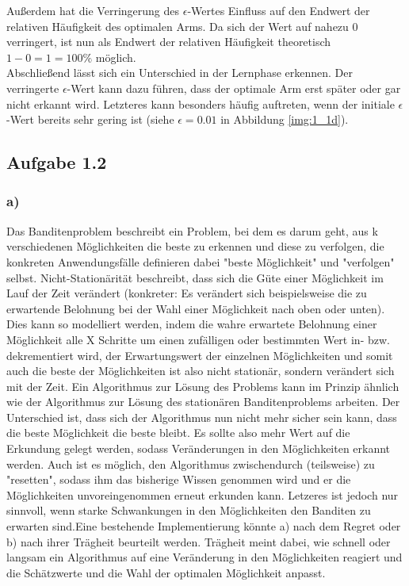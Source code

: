 \documentclass[11pt]{article}
\begin{document}
Außerdem hat die Verringerung des $\epsilon$-Wertes Einfluss auf den Endwert der relativen Häufigkeit des optimalen Arms. Da sich der Wert auf nahezu $0$ verringert, ist nun als Endwert der relativen Häufigkeit theoretisch $1-0=1=100\%$ möglich.\\
Abschließend lässt sich ein Unterschied in der Lernphase erkennen. Der verringerte $\epsilon$-Wert kann dazu führen, dass der optimale Arm erst später oder gar nicht erkannt wird. Letzteres kann besonders häufig auftreten, wenn der initiale $\epsilon$-Wert bereits sehr gering ist (siehe $\epsilon=0.01$ in Abbildung \ref{img:1_1d}).

\subsection*{Aufgabe 1.2}
\subsubsection*{a)}
Das Banditenproblem beschreibt ein Problem, bei dem es darum geht, aus k verschiedenen Möglichkeiten die beste zu erkennen und diese zu verfolgen, die konkreten Anwendungsfälle definieren dabei "beste Möglichkeit" und "verfolgen" selbst. Nicht-Stationärität beschreibt, dass sich die Güte einer Möglichkeit im Lauf der Zeit verändert (konkreter: Es verändert sich beispielsweise die zu erwartende Belohnung bei der Wahl einer Möglichkeit nach oben oder unten). Dies kann so modelliert werden, indem die wahre erwartete Belohnung einer Möglichkeit alle X Schritte um einen zufälligen oder bestimmten Wert in- bzw. dekrementiert wird, der Erwartungswert der einzelnen Möglichkeiten und somit auch die beste der Möglichkeiten ist also nicht stationär, sondern verändert sich mit der Zeit. Ein Algorithmus zur Lösung des Problems kann im Prinzip ähnlich wie der Algorithmus zur Lösung des stationären Banditenproblems arbeiten. Der Unterschied ist, dass sich der Algorithmus nun nicht mehr sicher sein kann, dass die beste Möglichkeit die beste bleibt. Es sollte also mehr Wert auf die Erkundung gelegt werden, sodass Veränderungen in den Möglichkeiten erkannt werden. Auch ist es möglich, den Algorithmus zwischendurch (teilsweise) zu "resetten", sodass ihm das bisherige Wissen genommen wird und er die Möglichkeiten unvoreingenommen erneut erkunden kann. Letzeres ist jedoch nur sinnvoll, wenn starke Schwankungen in den Möglichkeiten den Banditen zu erwarten sind.Eine bestehende Implementierung könnte a) nach dem Regret oder b) nach ihrer Trägheit beurteilt werden. Trägheit meint dabei, wie schnell oder langsam ein Algorithmus auf eine Veränderung in den Möglichkeiten reagiert und die Schätzwerte und die Wahl der optimalen Möglichkeit anpasst.
\end{document}
